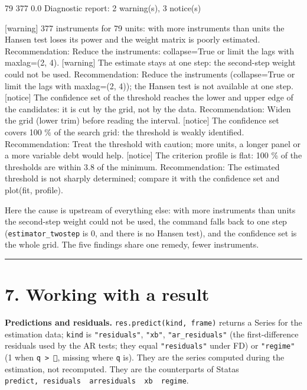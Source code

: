 \documentclass[
  10.5pt,
  a4paper,
]{article}
\newenvironment{Shaded}{}{}
\newcommand{\NormalTok}[1]{#1}
\begin{document}
\begin{Shaded}
\begin{Highlighting}[]
\NormalTok{79 377 0.0}
\NormalTok{Diagnostic report: 2 warning(s), 3 notice(s)}

\NormalTok{[warning] 377 instruments for 79 units: with more instruments than units the Hansen test loses its power and the weight matrix is poorly estimated.}
\NormalTok{    Recommendation: Reduce the instruments: collapse=True or limit the lags with maxlag=(2, 4).}
\NormalTok{[warning] The estimate stays at one step: the second{-}step weight could not be used.}
\NormalTok{    Recommendation: Reduce the instruments (collapse=True or limit the lags with maxlag=(2, 4)); the Hansen test is not available at one step.}
\NormalTok{[notice] The confidence set of the threshold reaches the lower and upper edge of the candidates: it is cut by the grid, not by the data.}
\NormalTok{    Recommendation: Widen the grid (lower trim) before reading the interval.}
\NormalTok{[notice] The confidence set covers 100 \% of the search grid: the threshold is weakly identified.}
\NormalTok{    Recommendation: Treat the threshold with caution; more units, a longer panel or a more variable debt would help.}
\NormalTok{[notice] The criterion profile is flat: 100 \% of the thresholds are within 3.8 of the minimum.}
\NormalTok{    Recommendation: The estimated threshold is not sharply determined; compare it with the confidence set and plot(fit, \textquotesingle{}profile\textquotesingle{}).}
\end{Highlighting}
\end{Shaded}

Here the cause is upstream of everything else: with more instruments
than units the second-step weight could not be used, the command falls
back to one step (\texttt{estimator\_twostep} is 0, and there is no
Hansen test), and the confidence set is the whole grid. The five
findings share one remedy, fewer instruments.

\begin{center}\rule{0.5\linewidth}{0.5pt}\end{center}

\section{7. Working with a result}\label{working-with-a-result}

\textbf{Predictions and residuals.} \texttt{res.predict(kind,\ frame)}
returns a Series for the estimation data; \texttt{kind} is
\texttt{"residuals"}, \texttt{"xb"}, \texttt{"ar\_residuals"} (the
first-difference residuals used by the AR tests; they equal
\texttt{"residuals"} under FD) or \texttt{"regime"} (1 when
\texttt{q\ \textgreater{}\ }, missing where \texttt{q} is). They are
the series computed during the estimation, not recomputed. They are the
counterparts of Stata\textquotesingle s
\texttt{predict,\ residuals\ \textbar{}\ arresiduals\ \textbar{}\ xb\ \textbar{}\ regime}.
\end{document}
